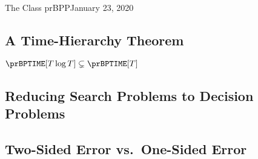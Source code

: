 \begin{lecture}{1}{The Class prBPP}{January 23, 2020}
\subsection{A Time-Hierarchy Theorem}

\begin{theorem}
  $\prBPTIME[T \log{T}] \subsetneq \prBPTIME[T]$
\end{theorem}


\subsection{Reducing Search Problems to Decision Problems}

\subsection{Two-Sided Error vs.\ One-Sided Error}

\end{lecture}
